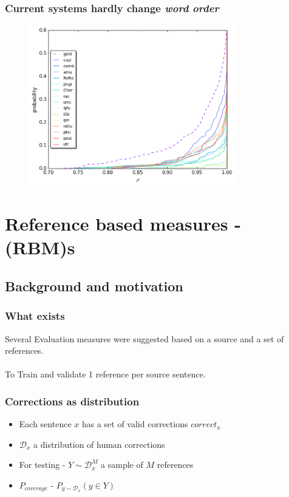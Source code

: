 \documentclass{beamer}
\begin{document}
\begin{frame}
	\frametitle{Current systems hardly change \emph{word order}}
	\begin{figure}
		\includegraphics[width = 0.8\textwidth]{spearman_ecdf}
	\end{figure}
\end{frame}
\section{Reference based measures - (RBM)s}
\subsection{Background and motivation}
\begin{frame}[label=RBM]
	\frametitle{What exists}
	Several Evaluation measures were suggested based on a source and a set of references.\\
	\hyperlink{fscore}{}
	\hyperlink{m2}{}
	\hyperlink{GLUE}{}
	\hyperlink{I-measure}{}\\
	To Train and validate 1 reference per source sentence.
\end{frame}

\begin{frame}
	\frametitle{Corrections as distribution}
	\begin{itemize}
		\item Each sentence $x$ has a set of valid corrections $correct_x$
		\item $\mathcal{D}_x$ a distribution of human corrections
		\item For testing - $Y\sim \mathcal{D}_x^M$ a sample of $M$ references 
		\item $P_{coverage}$ - $P_{y\sim \mathcal{D}_x}(y \in Y)$
	\end{itemize}
\end{frame}
\end{document}
